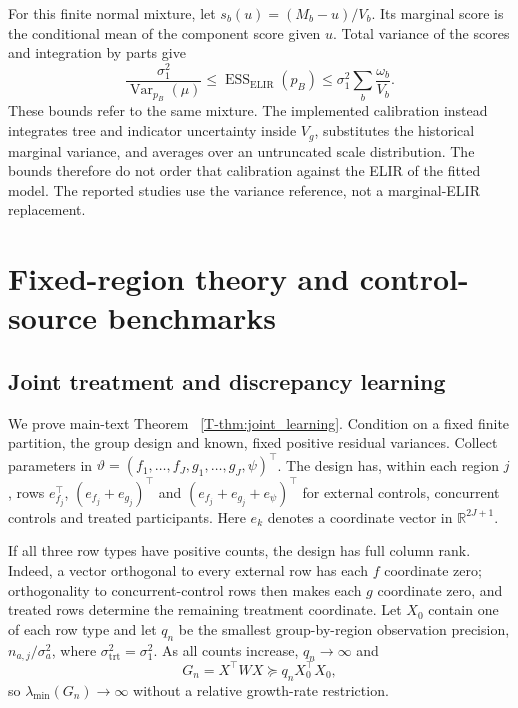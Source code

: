 \documentclass[11pt]{article}
\newcommand{\Var}{\operatorname{Var}}
\newcommand{\ESS}{\operatorname{ESS}}
\theoremstyle{remark}\newtheorem{remark}{Remark}[section]
\providecommand{\DIFaddtex}[1]{{\protect\color{blue} \sf #1}} %
\providecommand{\DIFaddbegin}{} %
\providecommand{\DIFaddend}{} %
\providecommand{\DIFadd}[1]{\texorpdfstring{\DIFaddtex{#1}}{#1}} %
\begin{document}
\DIFaddend For \DIFaddbegin \DIFadd{this finite normal mixture, let $s_b(u)=(M_b-u)/V_b$. Its marginal score is the conditional mean of the component score given $u$. Total variance of the scores and integration by parts give
}\[
\frac{\sigma_1^2}{\Var_{p_B}(\mu)}
\leq\ESS_{\mathrm{ELIR}}(p_B)
\leq\sigma_1^2\sum_b\frac{\omega_b}{V_b}.
\]
\DIFadd{These bounds refer to the same mixture. The implemented calibration instead integrates tree and indicator uncertainty inside $V_g$, substitutes the historical marginal variance, and averages over an untruncated scale distribution. The bounds therefore do not order that calibration against the ELIR of the fitted model. The reported studies use the variance reference, not a marginal-ELIR replacement.
 }\section{\DIFadd{Fixed-region theory and control-source benchmarks}}\label{sec:C}
\subsection{\DIFadd{Joint treatment and discrepancy learning}}\label{sec:C.joint}
\DIFadd{We prove }\DIFaddend main-text Theorem~ \DIFaddbegin \DIFadd{\ref{T-thm:joint_learning}. Condition on a fixed finite partition, the group design and known, fixed positive residual variances. Collect parameters in
$\vartheta=(f_1,\ldots,f_J,g_1,\ldots,g_J,\psi)^\top$.
The design has, within each region $j$, rows $e_{f_j}^\top$, $(e_{f_j}+e_{g_j})^\top$ and $(e_{f_j}+e_{g_j}+e_\psi)^\top$ for external controls, concurrent controls and treated participants. Here $e_k$ denotes a coordinate vector in $\mathbb R^{2J+1}$}\DIFaddend .
\DIFaddbegin 

\DIFadd{If all three row types have positive counts, the design has full column rank. Indeed, a vector orthogonal to every external row has each $f$ coordinate zero; orthogonality to concurrent-control rows then makes each $g$ coordinate zero, and treated rows determine the remaining treatment coordinate. Let $X_0$ contain one of each row type and let $q_n$ be the smallest group-by-region observation precision, $n_{a,j}/\sigma_a^2$, where $\sigma_{\mathrm{trt}}^2=\sigma_1^2$. As all counts increase, $q_n\to\infty$ and
}\[
G_n=X^\top WX\succeq q_nX_0^\top X_0,
\]
\DIFadd{so $\lambda_{\min}(G_n)\to\infty$ without a relative growth-rate restriction.
}
\end{document}
